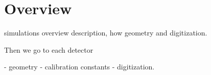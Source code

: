 \section{Overview}

simulations overview description, how geometry and digitization.

Then we go to each detector

- geometry
- calibration constants
- digitization.




